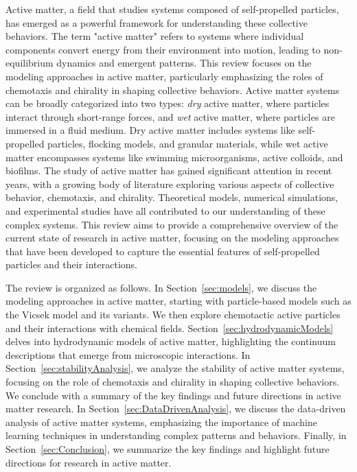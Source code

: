 \documentclass[a4paper, amsfonts, amssymb, amsmath, reprint, showkeys, showpacs, nofootinbib, twoside]{revtex4-2}
\begin{document}
Active matter, a field that studies systems composed of self-propelled particles, has emerged as a powerful framework for understanding these collective behaviors. The term "active matter" refers to systems where individual components convert energy from their environment into motion, leading to non-equilibrium dynamics and emergent patterns. This review focuses on the modeling approaches in active matter, particularly emphasizing the roles of chemotaxis and chirality in shaping collective behaviors.
Active matter systems can be broadly categorized into two types: \textit{dry} active matter, where particles interact through short-range forces, and \textit{wet} active matter, where particles are immersed in a fluid medium. Dry active matter includes systems like self-propelled particles, flocking models, and granular materials, while wet active matter encompasses systems like swimming microorganisms, active colloids, and biofilms.
The study of active matter has gained significant attention in recent years, with a growing body of literature exploring various aspects of collective behavior, chemotaxis, and chirality. Theoretical models, numerical simulations, and experimental studies have all contributed to our understanding of these complex systems. This review aims to provide a comprehensive overview of the current state of research in active matter, focusing on the modeling approaches that have been developed to capture the essential features of self-propelled particles and their interactions.

The review is organized as follows. In Section~\ref{sec:models}, we discuss the modeling approaches in active matter, starting with particle-based models such as the Vicsek model and its variants. We then explore chemotactic active particles and their interactions with chemical fields. Section~\ref{sec:hydrodynamicModels} delves into hydrodynamic models of active matter, highlighting the continuum descriptions that emerge from microscopic interactions. In Section~\ref{sec:stabilityAnalysis}, we analyze the stability of active matter systems, focusing on the role of chemotaxis and chirality in shaping collective behaviors. We conclude with a summary of the key findings and future directions in active matter research. In Section~\ref{sec:DataDrivenAnalysis}, we discuss the data-driven analysis of active matter systems, emphasizing the importance of machine learning techniques in understanding complex patterns and behaviors. Finally, in Section~\ref{sec:Conclusion}, we summarize the key findings and highlight future directions for research in active matter.
\end{document}
